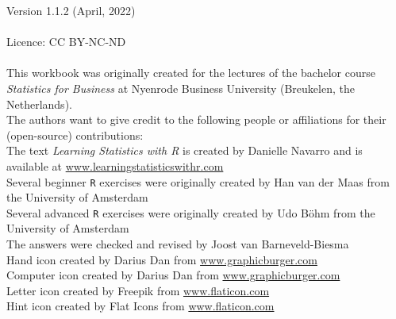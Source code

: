 \thispagestyle{emptyhead}

\vspace*{\fill} 

{\fontsize{8}{10}\selectfont

Version 1.1.2 (April, 2022) \\
\\
Licence: CC BY-NC-ND \\
\\
This workbook was originally created for the lectures of the bachelor course \textit{Statistics for Business} at Nyenrode Business University (Breukelen, the Netherlands). \\

The authors want to give credit to the following people or affiliations for their (open-source) contributions: \\

The text \textit{Learning Statistics with R} is created by Danielle Navarro and is available at \url{www.learningstatisticswithr.com} \\
Several beginner \texttt{R} exercises were originally created by Han van der Maas from the University of Amsterdam \\
Several advanced \texttt{R} exercises were originally created by Udo B{\"o}hm from the University of Amsterdam \\
The answers were checked and revised by Joost van Barneveld-Biesma \\
Hand icon created by Darius Dan from \url{www.graphicburger.com} \\
Computer icon created by Darius Dan from \url{www.graphicburger.com} \\
Letter icon created by Freepik from \url{www.flaticon.com} \\
Hint icon created by Flat Icons from \url{www.flaticon.com}

}

\clearpage %
